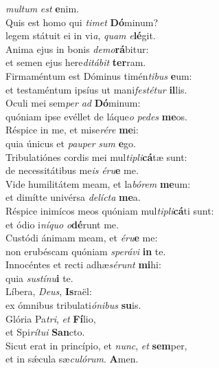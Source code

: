 \evenverse \textit{mul}\textit{tum} \textit{est} \textbf{e}nim.\\
\oddverse Quis est homo qui \textit{ti}\textit{met} \textbf{Dó}minum?~\*\\
\oddverse legem státuit ei in vi\textit{a}, \textit{quam} \textit{e}\textbf{lé}git.\\
\evenverse Anima ejus in bonis \textit{de}\textit{mo}\textbf{rá}bitur:~\*\\
\evenverse et semen ejus here\textit{di}\textit{tá}\textit{bit} \textbf{ter}ram.\\
\oddverse Firmaméntum est Dóminus timén\textit{ti}\textit{bus} \textbf{e}um:~\*\\
\oddverse et testaméntum ipsíus ut mani\textit{fe}\textit{sté}\textit{tur} \textbf{il}lis.\\
\evenverse Oculi mei sem\textit{per} \textit{ad} \textbf{Dó}minum:~\*\\
\evenverse quóniam ipse evéllet de láque\textit{o} \textit{pe}\textit{des} \textbf{me}os.\\
\oddverse Réspice in me, et mise\textit{ré}\textit{re} \textbf{me}i:~\*\\
\oddverse quia únicus et \textit{pau}\textit{per} \textit{sum} \textbf{e}go.\\
\evenverse Tribulatiónes cordis mei mul\textit{ti}\textit{pli}\textbf{cá}tæ sunt:~\*\\
\evenverse de necessitátibus me\textit{is} \textit{é}\textit{ru}\textbf{e} me.\\
\oddverse Vide humilitátem meam, et la\textit{bó}\textit{rem} \textbf{me}um:~\*\\
\oddverse et dimítte univérsa \textit{de}\textit{lí}\textit{cta} \textbf{me}a.\\
\evenverse Réspice inimícos meos quóniam mul\textit{ti}\textit{pli}\textbf{cá}ti sunt:~\*\\
\evenverse et ódio i\textit{ní}\textit{quo} \textit{o}\textbf{dé}runt me.\\
\oddverse Custódi ánimam meam, et \textit{é}\textit{ru}\textbf{e} me:~\*\\
\oddverse non erubéscam quóniam \textit{spe}\textit{rá}\textit{vi} \textbf{in} te.\\
\evenverse Innocéntes et recti adhæ\textit{sé}\textit{runt} \textbf{mi}hi:~\*\\
\evenverse quia \textit{su}\textit{stí}\textit{nu}\textbf{i} te.\\
\oddverse Líbera, \textit{De}\textit{us}, \textbf{Is}raël:~\*\\
\oddverse ex ómnibus tribulati\textit{ó}\textit{ni}\textit{bus} \textbf{su}is.\\
\evenverse Glória Pa\textit{tri}, \textit{et} \textbf{Fí}lio,~\*\\
\evenverse et Spi\textit{rí}\textit{tu}\textit{i} \textbf{San}cto.\\
\oddverse Sicut erat in princípio, et \textit{nunc}, \textit{et} \textbf{sem}per,~\*\\
\oddverse et in sǽcula sæ\textit{cu}\textit{ló}\textit{rum}. \textbf{A}men.\\
